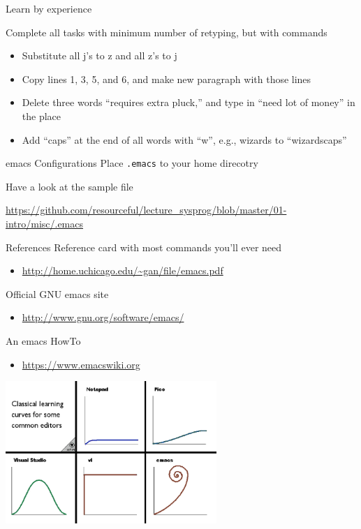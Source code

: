 \documentclass[newPxFont,sthlmFooter,nooffset]{beamer}
\begin{document}
\begin{frame}[containsverbatim,t]{Learn by experience}




Complete all tasks with minimum number of retyping, but with commands
\begin{itemize}
\item Substitute all j's to z and all z's to j
\item Copy lines 1, 3, 5, and 6, and make new paragraph with those lines
\item Delete three words ``requires extra pluck,'' and type in ``need lot of money'' in the place
\item Add ``caps'' at the end of all words with ``w'', e.g., wizards to ``wizardscaps''
\end{itemize}


\end{frame}

\begin{frame}[t]{emacs Configurations}
Place \texttt{.emacs} to your home direcotry

\bigskip
Have a look at the sample file

\url{https://github.com/resourceful/lecture_sysprog/blob/master/01-intro/misc/.emacs}
\end{frame}


\begin{frame}[t]{References}
Reference card with most commands you’ll ever need
\begin{itemize}
\item \url{http://home.uchicago.edu/~gan/file/emacs.pdf}
\end{itemize}
\bigskip
Official GNU emacs site
\begin{itemize}
\item \url{http://www.gnu.org/software/emacs/}
\end{itemize}

\bigskip
An emacs HowTo
\begin{itemize}
\item \url{https://www.emacswiki.org}
\end{itemize}
\vspace{-2em}
\hfill
\includegraphics[width=0.6\textwidth]{./figure/learning_curve.png}
\end{frame}
\end{document}
